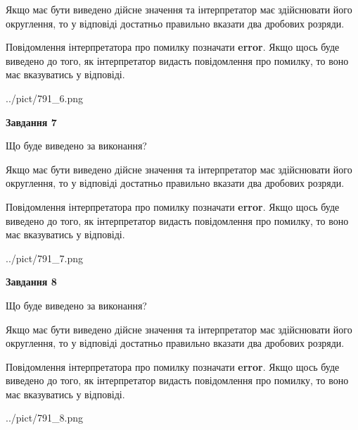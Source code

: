 \documentclass[12pt, ukrainian]{article}
\begin{document}
{\begin {Large}
Якщо має бути виведено дійсне значення та інтерпретатор має здійснювати його округлення, 
то у відповіді достатньо правильно вказати два дробових розряди.

Повідомлення інтерпретатора про помилку позначати \textbf{error}.
Якщо щось буде виведено до того, як інтерпретатор видасть повідомлення про помилку, 
то воно має вказуватись у відповіді. \par

\begin{center}
	{../pict/791_6.png}
\end{center}
\newpage

{\begin {center}\textbf{Завдання 7}\end {center}}\par
Що буде виведено за виконання? \par

Якщо має бути виведено дійсне значення та інтерпретатор має здійснювати його округлення, 
то у відповіді достатньо правильно вказати два дробових розряди.

Повідомлення інтерпретатора про помилку позначати \textbf{error}.
Якщо щось буде виведено до того, як інтерпретатор видасть повідомлення про помилку, 
то воно має вказуватись у відповіді. \par

\begin{center}
	{../pict/791_7.png}
\end{center}
\newpage

{\begin {center}\textbf{Завдання 8}\end {center}}\par
Що буде виведено за виконання? \par

Якщо має бути виведено дійсне значення та інтерпретатор має здійснювати його округлення, 
то у відповіді достатньо правильно вказати два дробових розряди.

Повідомлення інтерпретатора про помилку позначати \textbf{error}.
Якщо щось буде виведено до того, як інтерпретатор видасть повідомлення про помилку, 
то воно має вказуватись у відповіді. \par

\begin{center}
	{../pict/791_8.png}
\end{center}
\newpage


\end{Large}}
\end{document}
